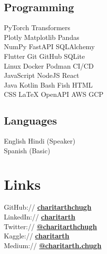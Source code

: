 \documentclass[]{resume-template}
\begin{document}
\begin{minipage}[t]{0.33\textwidth}
	\subsection{Programming}\label{subsec:programming}
	PyTorch \textbullet{} Transformers \textbullet{} \\
	Plotly \textbullet{} Matplotlib \textbullet{} Pandas \textbullet{}\\
	NumPy \textbullet{} FastAPI \textbullet SQLAlchemy \\
	Flutter \textbullet{} Git \textbullet{} GitHub \textbullet{} SQLite \textbullet{}\\
	Linux \textbullet Docker \textbullet Podman \textbullet {} CI/CD \\
	JavaScript \textbullet{} NodeJS \textbullet{} React \\
	Java \textbullet{} Kotlin \textbullet{} Bash \textbullet{} Fish \textbullet{} HTML \textbullet{}\\
	CSS \textbullet{} \LaTeX \textbullet{} OpenAPI \textbullet{} AWS \textbullet{} GCP
	\vspace{\topsep}
	\subsection{Languages}
	English \textbullet{} Hindi (Speaker)\\
	Spanish (Basic)


	\section{Links}\label{sec:links}
	GitHub:// \href{https://github.com/charitarthchugh}{\textbf {charitarthchugh}} \\
	LinkedIn:// \href{https:///www.linkedin.com/in/charitarth}{\textbf {charitarth}} \\
	Twitter:// \href{https://twitter.com/charitarthchugh}{\textbf{@charitarthchugh}}\\
	Kaggle:// \href{https://kaggle.com/charitarth}{\textbf{charitarth}}\\
	Medium:// \href{https://medium.com/@charitarth.chugh}{\textbf{@charitarth.chugh}}\\

\end{minipage}
\end{document}
